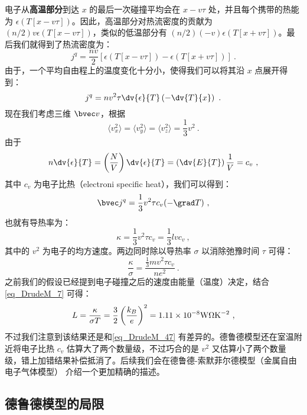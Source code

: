 电子从\textbf{高温部分}到达 $x$ 的最后一次碰撞平均会在 $x-v\tau$ 处，并且每个携带的热能为 $\epsilon(T[x-v\tau])$。因此，高温部分对热流密度的贡献为 $(n/2)v\epsilon(T[x-v\tau])$，类似的低温部分有 $(n/2)(-v)\epsilon(T[x+v\tau])$。最后我们就得到了热流密度为：
\begin{equation}
j^q = \frac{nv}{2}[\epsilon(T[x-v\tau])-\epsilon(T[x+v\tau])]~.
\end{equation}
由于，一个平均自由程上的温度变化十分小，使得我们可以将其沿 $x$ 点展开得到：
\begin{equation}
j^q = nv^2\tau\dv{\epsilon}{T}\left(-\dv{T}{x}\right)~.
\end{equation}
现在我们考虑三维 $\bvec v$，根据
\begin{equation}
\langle v_x^2\rangle = \langle v_y^2\rangle=\langle v_z^2 \rangle = \frac{1}{3}v^2~.
\end{equation}
由于
\begin{equation}
n\dv{\epsilon}{T}=\left(\frac{N}{V}\right)\dv{\epsilon}{T}=\left(\dv{E}{T}\right)\frac{1}{V}=c_v~,
\end{equation}
其中 $c_v$ 为电子比热（electroni specific heat），我们可以得到：
\begin{equation}
\bvec j^q =\frac{1}{3}v^2\tau c_v(-\grad T)~,
\end{equation}
也就有导热率为：
\begin{equation}
\kappa=\frac{1}{3}v^2\tau c_v =\frac{1}{3}lvc_v~,
\end{equation}
其中的 $v^2$ 为电子的均方速度。两边同时除以导热率 $\sigma$ 以消除弛豫时间 $\tau$ 可得：
\begin{equation}
\frac{\kappa}{\sigma}=\frac{\frac{1}{3}mv^2\tau c_v}{ne^2}~.
\end{equation}
之前我们的假设已经提到电子碰撞之后的速度由能量（温度）决定，结合\autoref{eq_DrudeM_7} 可得：
\begin{equation}
L=\frac{\kappa}{\sigma T}=\frac{3}{2}\left(\frac{k_B}{e}\right)^2 = 1.11\times10^{-8}\rm{W\Omega K^{-2}}~,
\end{equation}
不过我们注意到该结果还是和\autoref{eq_DrudeM_47} 有差异的。德鲁德模型还在室温附近将电子比热 $c_v$ 估算大了两个数量级，不过巧合的是 $v^2$ 又估算小了两个数量级，错上加错结果补偿抵消了。后续我们会在德鲁德-索默菲尔德模型（金属自由电子气体模型）%
介绍一个更加精确的描述。

\subsection{德鲁德模型的局限}

